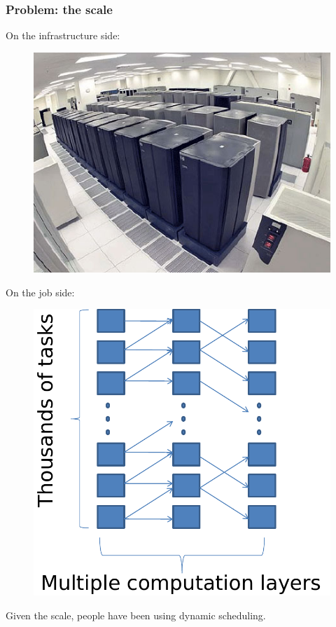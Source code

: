 \documentclass{beamer}
\begin{document}
\begin{frame}
  \frametitle{Problem: the scale}
  \begin{minipage}[t]{0.45\linewidth}
    On the infrastructure side:
    \begin{figure}
    \centering
    \includegraphics[scale=0.3]{beautiful-datacenter-wiring14.jpg}
    \end{figure}
  \end{minipage}
  \hfill
  \begin{minipage}[t]{0.45\linewidth}
    On the job side:
    \begin{figure}
    \centering
    \includegraphics[scale=0.3]{large_job}
    \end{figure}
  \end{minipage}

  \vspace{1cm}

  Given the scale, people have been using dynamic scheduling.
\end{frame}
\end{document}
